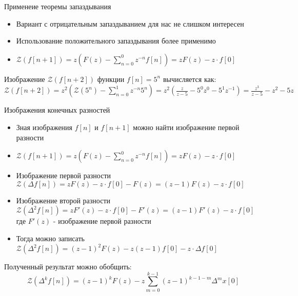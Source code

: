 \documentclass[12pt,twoside]{report}
\theoremstyle{MyNonumberplain}
\begin{document}
    
        \begin{frame}{Применеие теоремы запаздывания}
            \begin{itemize}
                \item <1-> Вариант с отрицательным запаздыванием для нас не слишком интересен
                \item <2-> Использование положительного запаздывания более применимо
                \item <3-> $\displaystyle \mathcal{Z}(f[n+1])=z\left(F(z)-\sum_{n=0}^0 z^{-n}f[n]\right)=zF(z) - z\cdot f[0]$
            \end{itemize}

                Изображение $\mathcal{Z}(f[n+2])$ функции $f[n]=5^n$ вычисляется как:\\
                $\displaystyle \mathcal{Z}(f[n+2])= z^2\left(\mathcal{Z}(5^n)-\sum_{n=0}^1 z^{-n}5^n\right)=
                z^2\left(\frac{z}{z-5} - 5^0z^0-5^1z^{-1}\right)=\frac{z^3}{z-5}-z^2-5z$
        \end{frame}
    
        \begin{frame}{Изображения конечных разностей}
            \begin{itemize}
                \item <1-> Зная изображения $f[n]$ и $f[n+1]$ можно найти изображение первой разности
                \item <2-> $\displaystyle \mathcal{Z}(f[n+1])=z\left(F(z)-\sum_{n=0}^0 z^{-n}f[n]\right)=zF(z) - z\cdot f[0]$
                \item <3-> Изображение первой разности $\mathcal{Z}(\Delta f[n])=zF(z) - z\cdot f[0] - F(z)=(z-1)F(z) -z\cdot f[0]$
                \item <4-> Изображение второй разности $\mathcal{Z}(\Delta^2 f[n])=zF'(z) - z\cdot f[0] - F'(z)=(z-1)F'(z) -z\cdot f[0]$
                где $F'(z)$ - изображение первой разности
                \item <5-> Тогда можно записать $\mathcal{Z}(\Delta^2 f[n])=(z-1)^2F(z) -z(z-1)f[0]-z\cdot\Delta f[0]$
            \end{itemize}
            Полученный результат можно обобщить:\\
                $$\mathcal{Z}(\Delta^k f[n])=(z-1)^k F(z)-z\sum_{m=0}^{k-1} (z-1)^{k-1-m} \Delta^m x[0]$$
        \end{frame}
    
\end{document}
